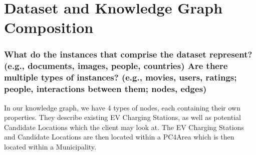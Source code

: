 \documentclass{article}
\newcommand{\question}[1]{#1}
\begin{document}


\section{Dataset and Knowledge Graph Composition}

\question{\subsubsection*{What do the instances that comprise the dataset represent?(e.g., documents, images, people, countries) Are there multiple types
		of instances? (e.g., movies, users, ratings; people, interactions between them; nodes, edges)}}
In our knowledge graph, we have 4 types of nodes, each containing their own properties. They describe existing EV Charging Stations, as well as potential Candidate Locations which the client may look at. The EV Charging Stations and Candidate Locations are then located within a PC4Area which is then located within a Municipality.
\end{document}
